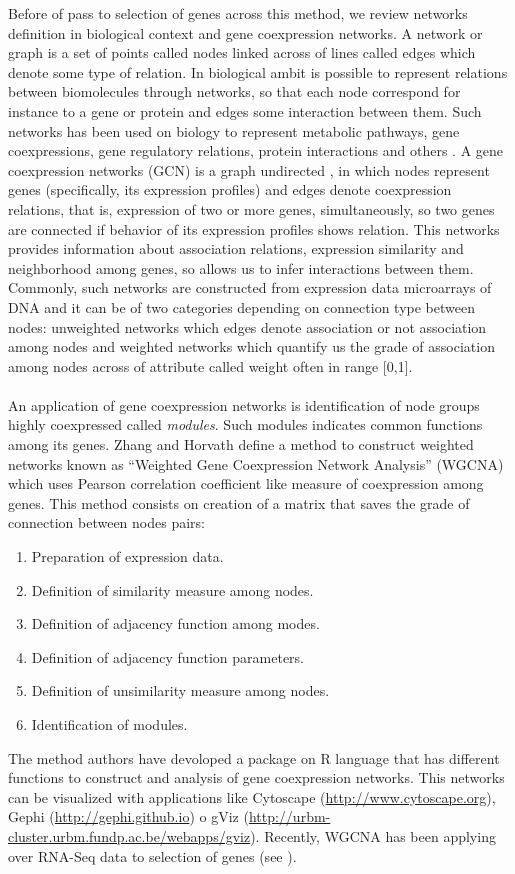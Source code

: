 \documentclass{bmcart}
\begin{document}
Before of pass to selection of genes across this method, we review networks definition in biological context and gene coexpression networks. A network or graph is a set of points called nodes linked across of lines called edges which denote some type of relation. In biological ambit is possible to represent relations between biomolecules through networks, so that each node correspond for instance to a gene or protein and edges some interaction between them. Such networks has been used on biology to represent metabolic pathways, gene coexpressions, gene regulatory relations, protein interactions and others \cite{Barabasi2014,WIDM:WIDM1061}. A gene coexpression networks (GCN) is a graph undirected , in which nodes represent genes (specifically, its expression profiles) and edges denote coexpression relations, that is, expression of two or more genes, simultaneously, so two genes are connected if behavior of its expression profiles shows relation. This networks provides information about association relations, expression similarity and neighborhood among genes, so allows us to infer interactions between them. Commonly, such networks are constructed from expression data microarrays of DNA and it can be of two categories depending on connection type between nodes: unweighted networks which edges denote association or not association among nodes and weighted networks which quantify us the grade of association among nodes across of attribute called weight often in range {[}0,1{]}.\\
\\
An application of gene coexpression networks is identification of node groups highly coexpressed called \emph{modules}. Such modules indicates common functions among its genes. Zhang and Horvath \cite{Zhang05ageneral} define a method to construct weighted networks known as ``Weighted Gene Coexpression Network Analysis'' (WGCNA) which uses Pearson correlation coefficient like measure of coexpression among genes. This method consists on creation of a matrix that saves the grade of connection between nodes pairs:
\begin{enumerate}
\item Preparation of expression data.
\item Definition of similarity measure among nodes.
\item Definition of adjacency function among modes.
\item Definition of adjacency function parameters.
\item Definition of unsimilarity measure among nodes.
\item Identification of modules.
\end{enumerate}
The method authors have devoloped a package on R language that has different functions to construct and analysis of gene coexpression networks. This networks can be visualized with applications like Cytoscape (\url{http://www.cytoscape.org}), Gephi (\url{http://gephi.github.io}) o gViz (\url{http://urbm-cluster.urbm.fundp.ac.be/webapps/gviz}). Recently, WGCNA has been applying over RNA-Seq data to selection of genes (see \cite{doi:10.1038/nature12364,Davidson2011,Hollender2014}).
\end{document}
